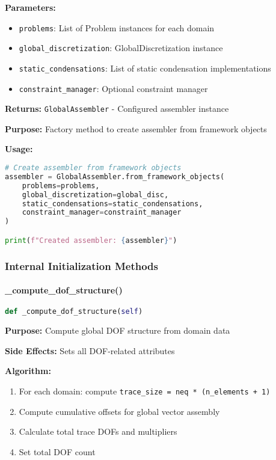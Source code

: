 \textbf{Parameters:}
\begin{itemize}
    \item \texttt{problems}: List of Problem instances for each domain
    \item \texttt{global\_discretization}: GlobalDiscretization instance
    \item \texttt{static\_condensations}: List of static condensation implementations
    \item \texttt{constraint\_manager}: Optional constraint manager
\end{itemize}

\textbf{Returns:} \texttt{GlobalAssembler} - Configured assembler instance

\textbf{Purpose:} Factory method to create assembler from framework objects

\textbf{Usage:}
\begin{lstlisting}[language=Python, caption=Factory Method Usage]
# Create assembler from framework objects
assembler = GlobalAssembler.from_framework_objects(
    problems=problems,
    global_discretization=global_disc,
    static_condensations=static_condensations,
    constraint_manager=constraint_manager
)

print(f"Created assembler: {assembler}")
\end{lstlisting}

\subsubsection{Internal Initialization Methods}

\paragraph{\_compute\_dof\_structure()}\leavevmode
\begin{lstlisting}[language=Python, caption=Compute DOF Structure Method]
def _compute_dof_structure(self)
\end{lstlisting}

\textbf{Purpose:} Compute global DOF structure from domain data

\textbf{Side Effects:} Sets all DOF-related attributes

\textbf{Algorithm:}
\begin{enumerate}
    \item For each domain: compute \texttt{trace\_size = neq * (n\_elements + 1)}
    \item Compute cumulative offsets for global vector assembly
    \item Calculate total trace DOFs and multipliers
    \item Set total DOF count
\end{enumerate}

